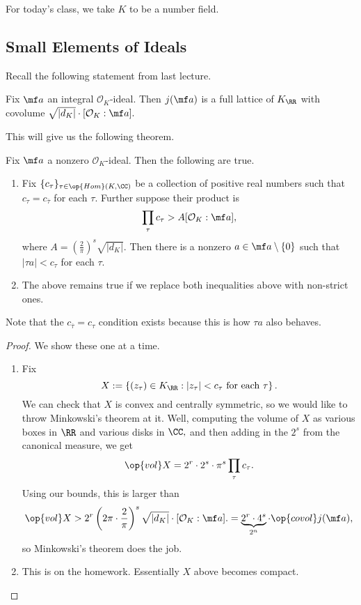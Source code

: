 
















For today's class, we take $K$ to be a number field.

\subsection{Small Elements of Ideals}
Recall the following statement from last lecture.
\begin{proposition}
    Fix $\mf a$ an integral $\mathcal O_K$-ideal. Then $j(\mf a)$ is a full lattice of $K_\RR$ with covolume $\sqrt{|d_K|}\cdot[\mathcal O_K:\mf a].$
\end{proposition}
This will give us the following theorem.
\begin{theorem} \label{thm:minkapp}
    Fix $\mf a$ a nonzero $\mathcal O_K$-ideal. Then the following are true.
    \begin{enumerate}[label=(\alph*)]
        \item Fix $\{c_\tau\}_{\tau\in\op{Hom}(K,\CC)}$ be a collection of positive real numbers such that $c_\tau=c_{\overline\tau}$ for each $\tau.$ Further suppose their product is
        \[\prod_\tau c_\tau>A[\mathcal O_K:\mf a],\]
        where $A=\left(\frac2\pi\right)^s\sqrt{|d_K|}.$ Then there is a nonzero $a\in\mf a\setminus\{0\}$ such that $|\tau a|<c_\tau$ for each $\tau.$
        \item The above remains true if we replace both inequalities above with non-strict ones.
    \end{enumerate}
\end{theorem}
Note that the $c_{\overline\tau}=c_\tau$ condition exists because this is how $\tau a$ also behaves.
\begin{proof}
    We show these one at a time.
    \begin{enumerate}[label=(\alph*)]
        \item Fix
        \[X:=\left\{(z_\tau)\in K_\RR:|z_\tau|<c_\tau\text{ for each }\tau\right\}.\]
        We can check that $X$ is convex and centrally symmetric, so we would like to throw Minkowski's theorem at it. Well, computing the volume of $X$ as various boxes in $\RR$ and various disks in $\CC,$ and then adding in the $2^s$ from the canonical measure, we get
        \[\op{vol}X=2^r\cdot2^s\cdot\pi^s\prod_{\tau}c_\tau.\]
        Using our bounds, this is larger than
        \[\op{vol}X>2^r\left(2\pi\cdot\frac{2}\pi\right)^s\sqrt{|d_K|}\cdot[\mathcal O_K:\mf a].=\underbrace{2^r\cdot4^s}_{2^n}\cdot\op{covol}j(\mf a),\]
        so Minkowski's theorem does the job.
        \item This is on the homework. Essentially $X$ above becomes compact.
        \qedhere
    \end{enumerate}
\end{proof}
